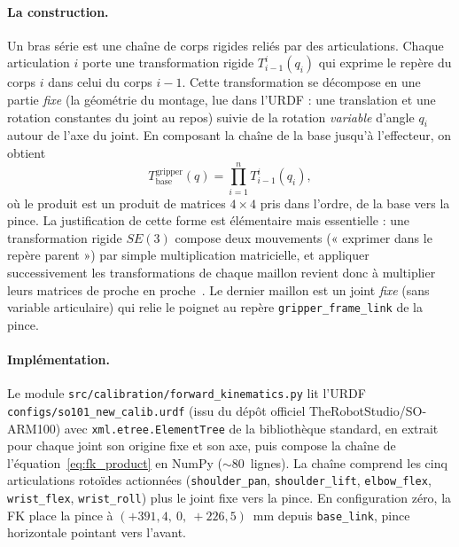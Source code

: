\paragraph{La construction.} Un bras série est une chaîne de corps rigides reliés
par des articulations. Chaque articulation $i$ porte une transformation rigide
$T_{i-1}^{i}(q_i)$ qui exprime le repère du corps $i$ dans celui du corps $i-1$.
Cette transformation se décompose en une partie \emph{fixe} (la géométrie du
montage, lue dans l'URDF : une translation et une rotation constantes du joint
au repos) suivie de la rotation \emph{variable} d'angle $q_i$ autour de l'axe du
joint. En composant la chaîne de la base jusqu'à l'effecteur, on obtient
\begin{equation}
  T_{\text{base}}^{\text{gripper}}(q)
  = \prod_{i=1}^{n} T_{i-1}^{i}(q_i),
  \label{eq:fk_product}
\end{equation}
où le produit est un produit de matrices $4\times4$ pris dans l'ordre, de la base
vers la pince. La justification de cette forme est élémentaire mais essentielle :
une transformation rigide $SE(3)$ compose deux mouvements (« exprimer dans le
repère parent ») par simple multiplication matricielle, et appliquer
successivement les transformations de chaque maillon revient donc à multiplier
leurs matrices de proche en proche~\cite{siciliano_robotics_2009}. Le dernier
maillon est un joint \emph{fixe} (sans variable articulaire) qui relie le poignet
au repère \texttt{gripper\_frame\_link} de la pince.

\paragraph{Implémentation.} Le module
\texttt{src/calibration/forward\_kinematics.py} lit l'URDF
\texttt{configs/so101\_new\_calib.urdf} (issu du dépôt officiel
TheRobotStudio/SO-ARM100) avec \texttt{xml.etree.ElementTree} de la
bibliothèque standard, en extrait pour chaque joint son origine fixe et son axe,
puis compose la chaîne de l'équation~\eqref{eq:fk_product} en NumPy
($\sim$80~lignes). La chaîne comprend les cinq articulations rotoïdes actionnées
(\texttt{shoulder\_pan}, \texttt{shoulder\_lift}, \texttt{elbow\_flex},
\texttt{wrist\_flex}, \texttt{wrist\_roll}) plus le joint fixe vers la pince. En
configuration zéro, la FK place la pince à $(+391{,}4,\ 0,\ +226{,}5)$~mm depuis
\texttt{base\_link}, pince horizontale pointant vers l'avant.


